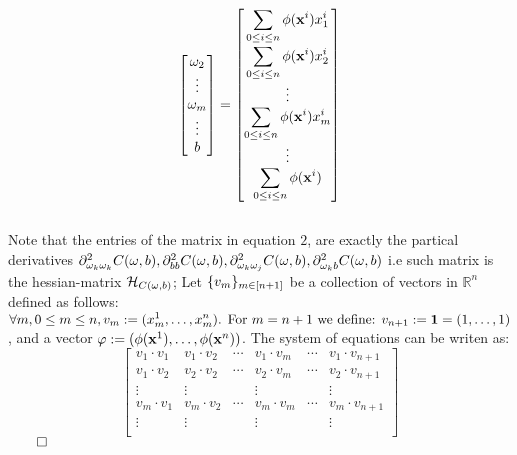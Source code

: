 \documentclass{exam}
\renewenvironment{proof}{{\noindent\itshape\ignorespaces}}{{\hfill$\qed$\\}}
\begin{document}
\begin{proof}
\begin{equation}
\begin{bmatrix}
            \omega_2\\
            \vdots \\
            \omega_m\\
           \vdots \\
            b
        \end{bmatrix} 
        = \begin{bmatrix}
            \displaystyle\sum_{\tiny 0 \leq i\leq n }\phi(\bold{x}^{i}) x^{i}_{1} \\[1.2em]
            \displaystyle\sum_{\tiny 0 \leq i\leq n }\phi(\bold{x}^{i}) x^{i}_{2}\\
            \vdots \\
            \displaystyle\sum_{\tiny 0 \leq i\leq n }\phi(\bold{x}^{i}) x^{i}_{m}\\
           \vdots \\
           \displaystyle\sum_{\tiny 0 \leq i\leq n }\phi(\bold{x}^{i})
        \end{bmatrix} 
\end{equation}
\\
Note that the entries of the matrix in equation $2$, are exactly the partical derivatives $\partial^2_{\omega_k\omega_k} C(\bold{\omega},b),\partial^2_{bb}C(\bold{\omega},b),\\
\partial^2_{\omega_k \omega_j} C(\bold{\omega},b),\partial^2_{\omega_k b} C(\bold{\omega},b)$ i.e such matrix is the hessian-matrix $\mathcal{H}_{C(\tiny \omega, b)}$; Let $\displaystyle\{ v_m \}_{\tiny m \in \left[ n + 1 \right]}$ be a collection of vectors in $\mathbb{R}^n$ defined as follows: $ \forall m, 0 \leq m \leq n, v_m := \displaystyle(x^{1}_{m}, \ldots ,x^{n}_{m}) \text{. For } m = n+1 \text{ we define: }v_{n+1} := \bold{1} = (1, \ldots ,1)$, and a vector $\bold{\varphi} := (\phi(\bold{x}^{1}), \ldots , \phi(\bold{x}^{n}))$. The system of equations 
can be writen as:\\
\begin{equation}
    \begin{bmatrix}
        v_1 \cdot v_1 & v_1 \cdot v_2 & \cdots & v_1 \cdot v_m & \cdots &v_1 \cdot v_{n+1}\\
        v_1 \cdot v_2 & v_2 \cdot v_2 & \cdots & v_2 \cdot v_m & \cdots &v_2 \cdot v_{n+1}\\
       \vdots  & \vdots  & \ & \vdots & \ & \vdots \\
       v_m \cdot v_1 & v_m \cdot v_2 & \cdots & v_m \cdot v_m & \cdots &v_m \cdot v_{n+1}\\
       \vdots  & \vdots  & \ & \vdots & \ & \vdots \\

\end{bmatrix}
\end{equation}
\end{proof}
\end{document}
